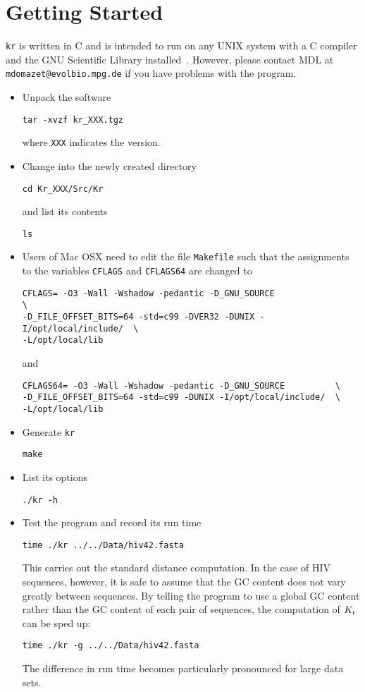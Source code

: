 \documentclass{article}
\newcommand{\bi}{\begin{itemize}}
\newcommand{\ei}{\end{itemize}}
\newcommand{\I}{\item}
\newcommand{\ty}{\texttt}
\newcommand{\kr}{K_{\rm r}}
\begin{document}
\section{Getting Started}
\ty{kr} is written in C and is
intended to run on any UNIX system with a C compiler and the GNU
Scientific Library installed~\cite{gal05:gnu}. However, please contact
MDL at \ty{mdomazet@evolbio.mpg.de} if you have problems with the
program.
\bi
\I Unpack the software
\begin{verbatim}
tar -xvzf kr_XXX.tgz
\end{verbatim}
where \ty{XXX} indicates the version.
\I Change into the newly created directory
\begin{verbatim}
cd Kr_XXX/Src/Kr
\end{verbatim}
and list its contents
\begin{verbatim}
ls
\end{verbatim}
\I Users of Mac OSX need to edit the file \ty{Makefile} such that the
assignments to the variables \ty{CFLAGS} and \ty{CFLAGS64} are changed
to
\begin{verbatim}
CFLAGS= -O3 -Wall -Wshadow -pedantic -D_GNU_SOURCE                    \
-D_FILE_OFFSET_BITS=64 -std=c99 -DVER32 -DUNIX -I/opt/local/include/  \
-L/opt/local/lib 
\end{verbatim}
and
\begin{verbatim}
CFLAGS64= -O3 -Wall -Wshadow -pedantic -D_GNU_SOURCE          \
-D_FILE_OFFSET_BITS=64 -std=c99 -DUNIX -I/opt/local/include/  \
-L/opt/local/lib 
\end{verbatim}
\I Generate \ty{kr}
\begin{verbatim}
make
\end{verbatim}
\I List its options
\begin{verbatim}
./kr -h
\end{verbatim}
\I Test the program and record its run time
\begin{verbatim}
time ./kr ../../Data/hiv42.fasta
\end{verbatim}
This carries out the standard distance computation. In the case of HIV
sequences, however, it is safe to assume that the GC content does not
vary greatly between sequences. By telling the program to use a global
GC content rather than the GC content of each pair of sequences, the
computation of $\kr$ can be sped up:
\begin{verbatim}
time ./kr -g ../../Data/hiv42.fasta
\end{verbatim}
The difference in run time becomes particularly pronounced for large
data sets.
\ei
\end{document}
